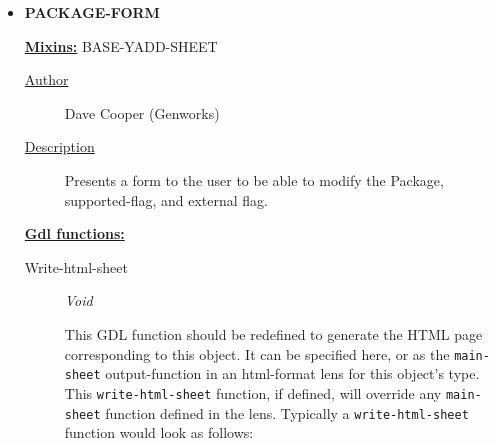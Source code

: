 \documentclass [11pt]{book}
\begin{document}
\begin{itemize}







\item {}
\label{prim:package-form}
\textbf{PACKAGE-FORM}


\textbf{
\underline{Mixins:}} BASE-YADD-SHEET





\begin{description}

\item [
\underline{Author}]


Dave Cooper (Genworks)



\item [
\underline{Description}]


Presents a form to the user to be able to modify the Package, 
supported-flag, and external flag.



\end{description}








\textbf{
\underline{Gdl functions:}}

\begin{description}

\item [Write-html-sheet]
\emph{Void}

 This GDL function should be redefined to generate the HTML page corresponding to this object.
It can be specified here, or as the \texttt{main-sheet} output-function in an html-format lens for this
object's type. This \texttt{write-html-sheet} function, if defined,  will override any \texttt{main-sheet}
function defined in the lens. Typically a \texttt{write-html-sheet} function would look as follows:




\end{description}







\end{itemize}
\end{document}

